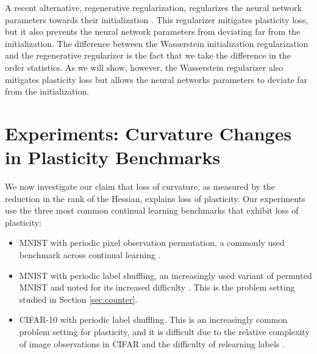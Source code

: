 \documentclass{article}
\begin{document}
A recent alternative, regenerative regularization, regularizes the neural network parameters towards their initialization \citep{kumar23_maint_plast_regen_regul}.
This regularizer mitigates plasticity loss, but it also prevents the neural network parameters from deviating far from the initialization.
The difference between the Wasserstein initialization regularization and the regenerative regularizer is the fact that we take the difference in the order statistics.
As we will show, however, the Wasserstein regularizer also mitigates plasticity loss but allows the neural networks parameters to deviate far from the initialization.

\section{Experiments: Curvature Changes in Plasticity Benchmarks}
\vspace{-2mm}
\label{sec:main_exp}

We now investigate our claim that loss of curvature, as measured by the reduction in the rank of the Hessian,
explains loss of plasticity.
Our experiments use the three most common continual learning benchmarks that exhibit loss of plasticity:
\begin{itemize}
  \item MNIST with periodic pixel observation permutation, a commonly used benchmark across continual learning \citep{goodfellow13_empir_inves_catas_forget_gradien,kumar23_maint_plast_regen_regul,dohare23_maint_plast_deep_contin_learn,elsayed23_utilit_pertur_gradien_descen,zenke17_contin}.
  \item MNIST with periodic label shuffling, an increasingly used variant of permuted MNIST and noted for its increased difficulty \citep{kumar23_maint_plast_regen_regul,lyle23_under,elsayed23_utilit_pertur_gradien_descen}. This is the problem setting studied in Section \ref{sec:counter}.
  \item CIFAR-10 \citep{Krizhevsky09learningmultiple} with periodic label shuffling. This is an increasingly common problem setting for plasticity, and it is difficult due to the relative complexity of image observations in CIFAR and the difficulty of relearning labels \citep{kumar23_maint_plast_regen_regul,lyle23_under,sokar23_dorman_neuron_phenom_deep_reinf_learn}.
\end{itemize}
\end{document}
